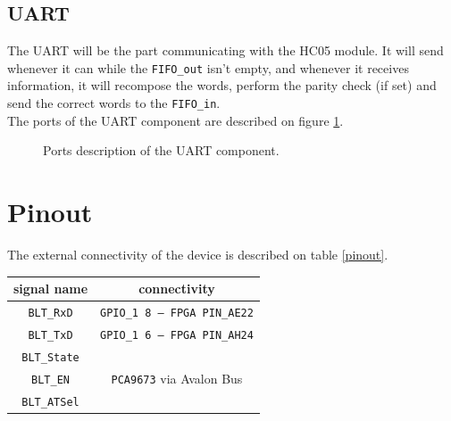 \documentclass[11pt]{article}
\begin{document}
\subsection{UART}
The UART will be the part communicating with the HC05 module. It will send whenever it can while the \texttt{FIFO\_out} isn't empty, and whenever it receives information, it will recompose the words, perform the parity check (if set) and send the correct words to the \texttt{FIFO\_in}.
\\
The ports of the UART component are described on figure \ref{uart_ports}.
\begin{figure}[H]
        \caption{Ports description of the UART component.}
        \label{uart_ports}
\end{figure}

\section{Pinout}
The external connectivity of the device is described on table \ref{pinout}.
\begin{center}
\label{pinout}
\begin{tabular}{|c|c|}
\hline
signal name & connectivity\\
\hline
\texttt{BLT\_RxD} & \texttt{GPIO\_1 8 -- FPGA PIN\_AE22}\\
\hline
\texttt{BLT\_TxD} & \texttt{GPIO\_1 6 -- FPGA PIN\_AH24}\\
\hline
\texttt{BLT\_State} & \multirow{3}{*}{\texttt{PCA9673} via Avalon Bus}\\
\cline{1-1}
\texttt{BLT\_EN} &\\
\cline{1-1}
\texttt{BLT\_ATSel} &\\
\hline
\end{tabular}
\end{center}
\end{document}
